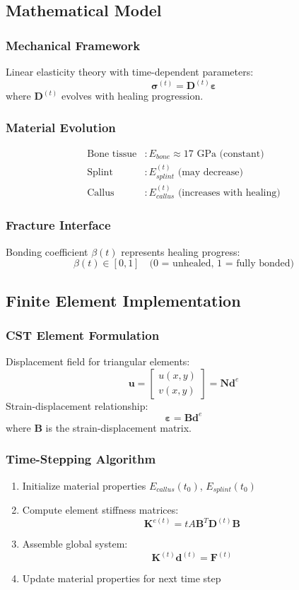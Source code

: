 \documentclass{article}
\begin{document}
\subsection{Mathematical Model}
\subsubsection{Mechanical Framework}
Linear elasticity theory with time-dependent parameters:
\[
  \bm{\sigma}^{(t)} = \mathbf{D}^{(t)}\bm{\varepsilon}
\]
where $\mathbf{D}^{(t)}$ evolves with healing progression.
\subsubsection{Material Evolution}
\begin{align*}
  \text{Bone tissue} & : E_{bone} \approx 17 \text{ GPa (constant)}        \\
  \text{Splint}      & : E_{splint}^{(t)} \text{ (may decrease)}           \\
  \text{Callus}      & : E_{callus}^{(t)} \text{ (increases with healing)}
\end{align*}
\subsubsection{Fracture Interface}
Bonding coefficient $\beta(t)$ represents healing progress:
\[
  \beta(t) \in [0,1] \quad \text{(0 = unhealed, 1 = fully bonded)}
\]
\subsection{Finite Element Implementation}
\subsubsection{CST Element Formulation}
Displacement field for triangular elements:
\[
  \mathbf{u} = \begin{bmatrix} u(x,y) \\ v(x,y) \end{bmatrix} = \mathbf{N}\mathbf{d}^e
\]
Strain-displacement relationship:
\[
  \bm{\varepsilon} = \mathbf{B}\mathbf{d}^e
\]
where $\mathbf{B}$ is the strain-displacement matrix.
\subsubsection{Time-Stepping Algorithm}
\begin{enumerate}
  \item Initialize material properties $E_{callus}(t_0)$, $E_{splint}(t_0)$
  \item Compute element stiffness matrices:
        \[
          \mathbf{K}^{e(t)} = tA\mathbf{B}^T\mathbf{D}^{(t)}\mathbf{B}
        \]
  \item Assemble global system:
        \[
          \mathbf{K}^{(t)}\mathbf{d}^{(t)} = \mathbf{F}^{(t)}
        \]
  \item Update material properties for next time step
\end{enumerate}
\end{document}
